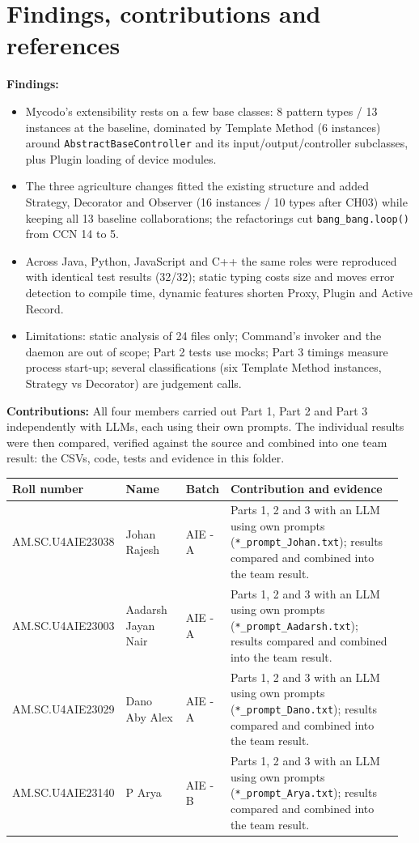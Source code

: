 \documentclass[11pt,a4paper]{article}
\begin{document}
\section{Findings, contributions and references}
\textbf{Findings:}\par
\begin{itemize}
\item Mycodo's extensibility rests on a few base classes: 8 pattern types / 13 instances at the baseline, dominated by Template Method (6 instances) around \texttt{AbstractBaseController} and its input/output/controller subclasses, plus Plugin loading of device modules.
\item The three agriculture changes fitted the existing structure and added Strategy, Decorator and Observer (16 instances / 10 types after CH03) while keeping all 13 baseline collaborations; the refactorings cut \texttt{bang\_\allowbreak{}bang.\allowbreak{}loop()} from CCN 14 to 5.
\item Across Java, Python, JavaScript and C++ the same roles were reproduced with identical test results (32/32); static typing costs size and moves error detection to compile time, dynamic features shorten Proxy, Plugin and Active Record.
\item Limitations: static analysis of 24 files only; Command's invoker and the daemon are out of scope; Part 2 tests use mocks; Part 3 timings measure process start-up; several classifications (six Template Method instances, Strategy vs Decorator) are judgement calls.
\end{itemize}
\textbf{Contributions:} All four members carried out Part 1, Part 2 and Part 3 independently with LLMs, each using their own prompts. The individual results were then compared, verified against the source and combined into one team result: the CSVs, code, tests and evidence in this folder.\par
{\small\setlength{\tabcolsep}{3pt}
\begin{longtable}{@{}P{0.19\linewidth}P{0.17\linewidth}P{0.08\linewidth}P{0.52\linewidth}@{}}\toprule
\textbf{Roll number} & \textbf{Name} & \textbf{Batch} & \textbf{Contribution and evidence} \\ \midrule\endhead
AM.SC.U4AIE23038 & Johan Rajesh & AIE - A & Parts 1, 2 and 3 with an LLM using own prompts (\texttt{*\_\allowbreak{}prompt\_\allowbreak{}Johan.\allowbreak{}txt}); results compared and combined into the team result. \\
AM.SC.U4AIE23003 & Aadarsh Jayan Nair & AIE - A & Parts 1, 2 and 3 with an LLM using own prompts (\texttt{*\_\allowbreak{}prompt\_\allowbreak{}Aadarsh.\allowbreak{}txt}); results compared and combined into the team result. \\
AM.SC.U4AIE23029 & Dano Aby Alex & AIE - A & Parts 1, 2 and 3 with an LLM using own prompts (\texttt{*\_\allowbreak{}prompt\_\allowbreak{}Dano.\allowbreak{}txt}); results compared and combined into the team result. \\
AM.SC.U4AIE23140 & P Arya & AIE - B & Parts 1, 2 and 3 with an LLM using own prompts (\texttt{*\_\allowbreak{}prompt\_\allowbreak{}Arya.\allowbreak{}txt}); results compared and combined into the team result. \\
\bottomrule\end{longtable}}
\end{document}
